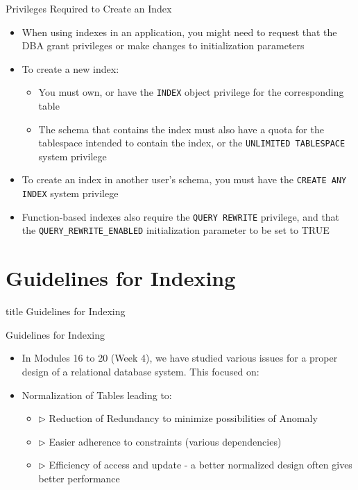 \documentclass[aspectratio=169, xcolor=dvipsnames]{beamer}
\begin{document}
\begin{frame}{Privileges Required to Create an Index}
    \begin{itemize}[<+->]
        \item When using indexes in an application, you might need to request that the DBA grant privileges or make changes to initialization parameters
        \item To create a new index:
        \begin{itemize}[<+->]
            \item You must own, or have the \texttt{INDEX} object privilege for the corresponding table
            \item The schema that contains the index must also have a quota for the tablespace intended to contain the index, or the \texttt{UNLIMITED TABLESPACE} system privilege
        \end{itemize}
        \item To create an index in another user's schema, you must have the \texttt{CREATE ANY INDEX} system privilege
        \item Function-based indexes also require the \texttt{QUERY REWRITE} privilege, and that the \texttt{QUERY\_REWRITE\_ENABLED} initialization parameter to be set to TRUE
    \end{itemize}
\end{frame}

\section{Guidelines for Indexing}
\begin{frame}
  \vfill
  \centering
  \begin{beamercolorbox}[sep=8pt,center,shadow=true,rounded=true]{title}
    Guidelines for Indexing\par%
  \end{beamercolorbox}
  \vfill
\end{frame}

\begin{frame}{Guidelines for Indexing}
    \begin{itemize}[<+->]
        \item In Modules 16 to 20 (Week 4), we have studied various issues for a proper design of a relational database system. This focused on:
        \item Normalization of Tables leading to:
        \begin{itemize}[<+->]
            \item $\triangleright$ Reduction of Redundancy to minimize possibilities of Anomaly
            \item $\triangleright$ Easier adherence to constraints (various dependencies)
            \item $\triangleright$ Efficiency of access and update - a better normalized design often gives better performance
        \end{itemize}
    \end{itemize}
\end{frame}
\end{document}
